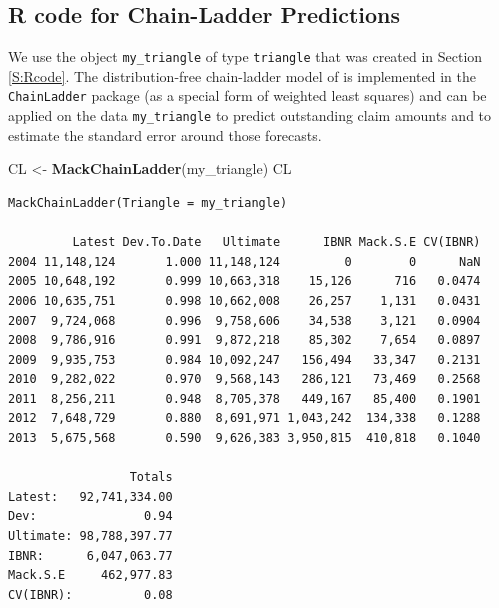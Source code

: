 \documentclass[]{book}
\newenvironment{Shaded}{\begin{snugshade}}{\end{snugshade}}
\newcommand{\KeywordTok}[1]{\textcolor[rgb]{0.13,0.29,0.53}{\textbf{#1}}}
\newcommand{\StringTok}[1]{\textcolor[rgb]{0.31,0.60,0.02}{#1}}
\newcommand{\OperatorTok}[1]{\textcolor[rgb]{0.81,0.36,0.00}{\textbf{#1}}}
\newcommand{\NormalTok}[1]{#1}
\begin{document}
\subsection{R code for Chain-Ladder
Predictions}\label{r-code-for-chain-ladder-predictions}

We use the object \texttt{my\_triangle} of type \texttt{triangle} that
was created in Section \ref{S:Rcode}. The distribution-free chain-ladder
model of \citet{Mack1993} is implemented in the \texttt{ChainLadder}
package \citep{R-chainladder} (as a special form of weighted least
squares) and can be applied on the data \texttt{my\_triangle} to predict
outstanding claim amounts and to estimate the standard error around
those forecasts.

\begin{Shaded}
\begin{Highlighting}[]
\NormalTok{CL <-}\StringTok{ }\KeywordTok{MackChainLadder}\NormalTok{(my_triangle)}
\NormalTok{CL}
\end{Highlighting}
\end{Shaded}

\begin{verbatim}
MackChainLadder(Triangle = my_triangle)

         Latest Dev.To.Date   Ultimate      IBNR Mack.S.E CV(IBNR)
2004 11,148,124       1.000 11,148,124         0        0      NaN
2005 10,648,192       0.999 10,663,318    15,126      716   0.0474
2006 10,635,751       0.998 10,662,008    26,257    1,131   0.0431
2007  9,724,068       0.996  9,758,606    34,538    3,121   0.0904
2008  9,786,916       0.991  9,872,218    85,302    7,654   0.0897
2009  9,935,753       0.984 10,092,247   156,494   33,347   0.2131
2010  9,282,022       0.970  9,568,143   286,121   73,469   0.2568
2011  8,256,211       0.948  8,705,378   449,167   85,400   0.1901
2012  7,648,729       0.880  8,691,971 1,043,242  134,338   0.1288
2013  5,675,568       0.590  9,626,383 3,950,815  410,818   0.1040

                 Totals
Latest:   92,741,334.00
Dev:               0.94
Ultimate: 98,788,397.77
IBNR:      6,047,063.77
Mack.S.E     462,977.83
CV(IBNR):          0.08
\end{verbatim}

\begin{Shaded}
\end{Shaded}
\end{document}
